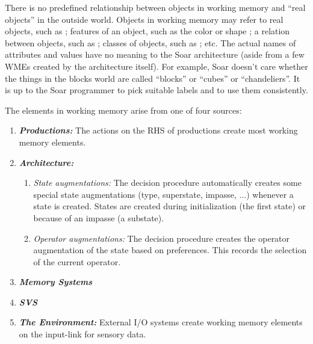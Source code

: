 There is no predefined relationship between objects in working memory and
``real objects'' in the outside world.  Objects in working memory may refer to
real objects, such as ; features of an object, such as the
color  or shape ; a relation between objects, such as ; classes of
objects, such as ; etc. The actual names of attributes and
values have no meaning to the Soar architecture (aside from a few WMEs
created by the architecture itself). For example, Soar doesn't care whether
the things in the blocks world are called ``blocks'' or ``cubes'' or
``chandeliers''. It is up to the Soar programmer to pick suitable labels and to
use them consistently.

The elements in working memory arise from one of four sources:

\vspace{-12pt}
\begin{enumerate}
	\item \textbf{\textit{Productions:}} The actions on the RHS of productions create most working memory elements. \vspace{-8pt}
	\item \textbf{\textit{Architecture:}} \vspace{-8pt}
	\begin{enumerate}
		\item \textit{State augmentations:} The decision procedure automatically creates some special state augmentations (type, superstate, impasse, ...) whenever a state is created.  States are created during initialization (the first state) or because of an impasse (a substate).  
		\vspace{-4pt}
	\item \textit{Operator augmentations:}  The decision procedure creates the operator augmentation of the state 
	based on preferences. This records the selection of the current operator.
	\vspace{-8pt}
	\end{enumerate}
	\item \textbf{\textit{Memory Systems}} \vspace{-8pt}
	\item \textbf{\textit{SVS}} \vspace{-8pt}
	\item \textbf{\textit{The Environment:}} External I/O systems create working memory elements on the input-link for sensory data.
\end{enumerate}

